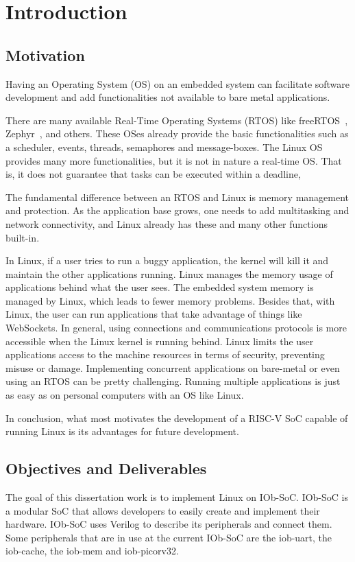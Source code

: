 \chapter{Introduction}
\label{chapter:introduction}

\section{Motivation}
\label{section:motivation}
Having an Operating System (OS) on an embedded system can facilitate software development and add functionalities not available to bare metal applications. 

There are many available Real-Time Operating Systems (RTOS) like freeRTOS~\cite{barry2009freertos}, Zephyr~\cite{zephyr}, and others. These OSes already provide the basic functionalities such as a scheduler, events, threads, semaphores and message-boxes. The Linux OS provides many more functionalities, but it is not in nature a real-time OS. That is, it does not guarantee that tasks can be executed within a deadline,

The fundamental difference between an RTOS and Linux is memory management and protection. As the application base grows, one needs to add multitasking and network connectivity, and Linux already has these and many other functions built-in.

In Linux, if a user tries to run a buggy application, the kernel will kill it and maintain the other applications running. Linux manages the memory usage of applications behind what the user sees. The embedded system memory is managed by Linux, which leads to fewer memory problems. Besides that, with Linux, the user can run applications that take advantage of things like WebSockets. In general, using connections and communications protocols is more accessible when the Linux kernel is running behind. Linux limits the user applications access to the machine resources in terms of security, preventing misuse or damage. Implementing concurrent applications on bare-metal or even using an RTOS can be pretty challenging. Running multiple applications is just as easy as on personal computers with an OS like Linux.

In conclusion, what most motivates the development of a RISC-V SoC capable of running Linux is its advantages for future development.

\section{Objectives and Deliverables}
\label{section:objectives}
The goal of this dissertation work is to implement Linux on IOb-SoC. IOb-SoC is a modular SoC that allows developers to easily create and implement their hardware. IOb-SoC uses Verilog to describe its peripherals and connect them. Some peripherals that are in use at the current IOb-SoC are the iob-uart, the iob-cache, the iob-mem and iob-picorv32.


